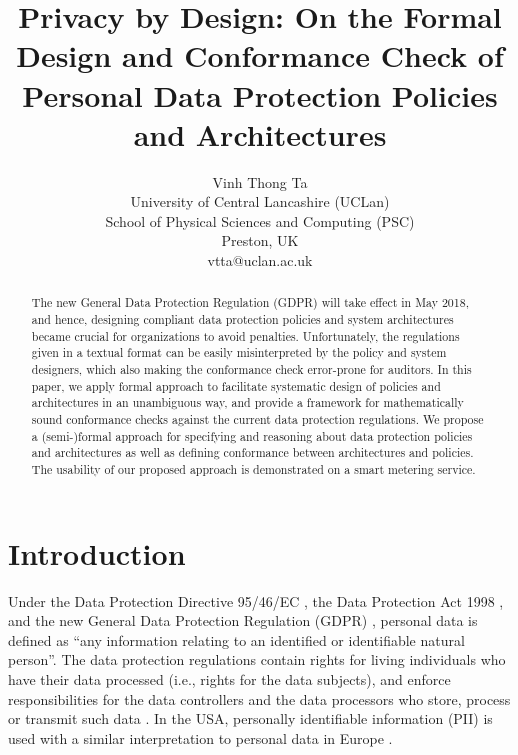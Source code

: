 \documentclass[a4paper]{article}
\begin{document}
\title{Privacy by Design: On the Formal Design and Conformance Check of  Personal Data Protection Policies and Architectures}


\author{Vinh Thong Ta\\
University of Central Lancashire (UCLan)\\
School of Physical Sciences and Computing (PSC)\\
 Preston, UK\\
vtta@uclan.ac.uk}


\maketitle

\begin{abstract}
The new General Data Protection Regulation (GDPR) will take effect in May 2018, and hence, designing compliant data protection policies and system architectures became crucial for organizations to avoid penalties. Unfortunately, the regulations given in a textual format can be easily misinterpreted by the policy and system designers, which also making the conformance check error-prone for auditors.    
In this paper, we apply formal approach to facilitate systematic design of policies and architectures in an unambiguous way, and provide a framework for mathematically sound conformance checks against the current data protection regulations.   
We propose a (semi-)formal approach for specifying and reasoning about data protection policies and architectures as well as defining conformance between architectures and policies. The usability of our proposed approach is demonstrated on a smart metering service. 
\end{abstract}

\section{Introduction}
\label{sec:int} 

Under the Data Protection Directive 95/46/EC \cite{d95}, the Data Protection Act 1998 \cite{data98}, and the new General Data Protection Regulation (GDPR) \cite{icoper}, personal data is defined as ``any information relating to an identified or identifiable natural person''.  The data protection regulations contain rights for living  individuals who have their data processed (i.e., rights for the data subjects), and enforce responsibilities for the data controllers and the data processors who store, process or transmit such data \cite{d95}. In the USA, personally identifiable information (PII) is used  with a similar interpretation to personal data in Europe \cite{NIST}. 
\end{document}
